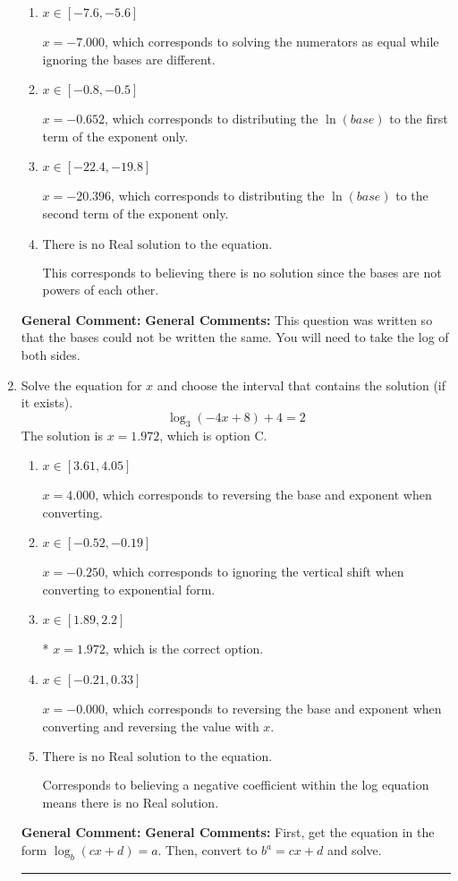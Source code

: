 \documentclass{extbook}[14pt]
\newcommand{\litem}[1]{\item #1

\rule{\textwidth}{0.4pt}}
\begin{document}
\begin{enumerate}
{\begin{enumerate}[label=\Alph*.]
* $x = -1.899$, which is the correct option.
\item \( x \in [-7.6, -5.6] \)

$x = -7.000$, which corresponds to solving the numerators as equal while ignoring the bases are different.
\item \( x \in [-0.8, -0.5] \)

$x = -0.652$, which corresponds to distributing the $\ln(base)$ to the first term of the exponent only.
\item \( x \in [-22.4, -19.8] \)

$x = -20.396$, which corresponds to distributing the $\ln(base)$ to the second term of the exponent only.
\item \( \text{There is no Real solution to the equation.} \)

This corresponds to believing there is no solution since the bases are not powers of each other.
\end{enumerate}

\textbf{General Comment:} \textbf{General Comments:} This question was written so that the bases could not be written the same. You will need to take the log of both sides.
}
\litem{
Solve the equation for $x$ and choose the interval that contains the solution (if it exists).
\[ \log_{3}{(-4x+8)}+4 = 2 \]The solution is \( x = 1.972 \), which is option C.\begin{enumerate}[label=\Alph*.]
\item \( x \in [3.61, 4.05] \)

$x = 4.000$, which corresponds to reversing the base and exponent when converting.
\item \( x \in [-0.52, -0.19] \)

$x = -0.250$, which corresponds to ignoring the vertical shift when converting to exponential form.
\item \( x \in [1.89, 2.2] \)

* $x = 1.972$, which is the correct option.
\item \( x \in [-0.21, 0.33] \)

$x = -0.000$, which corresponds to reversing the base and exponent when converting and reversing the value with $x$.
\item \( \text{There is no Real solution to the equation.} \)

Corresponds to believing a negative coefficient within the log equation means there is no Real solution.
\end{enumerate}

\textbf{General Comment:} \textbf{General Comments:} First, get the equation in the form $\log_b{(cx+d)} = a$. Then, convert to $b^a = cx+d$ and solve.
}
\end{enumerate}
\end{document}
